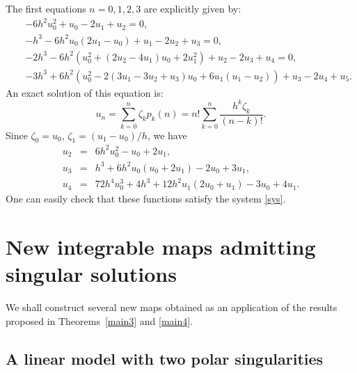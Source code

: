 \documentclass[10pt]{amsart}
\numberwithin{equation}{section}
\theoremstyle{definition}
\begin{document}
The first equations $n=0,1,2,3$ are explicitly given by:
\begin{eqnarray}
&&-6 h^{2} u_{0}^{2}+u_{0}-2 u_{1}+u_{2}=0,
\label{sys}
\\
\nonumber
&&-h^{3}-6 h^{2} u_{0} (2 u_{1}-u_{0})+u_{1}-2 u_{2}+u_{3}=0,
\\
\nonumber
&&-2 h^{3}-6 h^{2} \left (u_{0}^{2}+(2 u_{2}-4 u_{1}) u_{0}+2 u_{1}^{2}
\right )+u_{2}-2 u_{3}+u_{4}=0,
\\
\nonumber
&&-3 h^{3}+6 h^{2} \left (u_{0}^{2}-2 (3 u_{1}-3 u_{2}+u_{3}) u_{0}+6 u_{1}
(u_{1}-u_{2})\right )+u_{3}-2 u_{4}+u_{5}.
\end{eqnarray}
An exact solution of this equation is:
\begin{equation}
u_{n}=\sum _{k=0}^{n}\zeta _{k}p_{k}(n)=n!\sum _{k=0}^{n}
\frac{h^{k}\zeta _{k}}{(n-k)!}.
\label{eq10.31}
\end{equation}
Since $\zeta _{0}=u_{0}$, $\zeta _{1}=(u_{1}-u_{0})/h$, we have
\begin{eqnarray*}
u_{2}&=&6 h^{2} u_{0}^{2}-u_{0}+2 u_{1},
\\
u_{3}&=&h^{3}+6 h^{2} u_{0} (u_{0}+2 u_{1})-2 u_{0}+3 u_{1},
\\
u_{4}&=&72 h^{4} u_{0}^{3}+4 h^{3}+12 h^{2} u_{1} (2 u_{0}+u_{1})-3 u_{0}+4
u_{1}.
\end{eqnarray*}
One can easily check that these functions satisfy the system \eqref{sys}.

\section{New integrable maps admitting singular solutions}
\label{sec:10}

We shall construct several new maps obtained as an application of the results
proposed in Theorems~\ref{main3} and \ref{main4}.

\subsection{A linear model with two polar singularities}
\label{seis}
\end{document}
